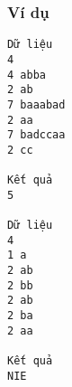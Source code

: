 \subsubsection{   Ví dụ  }
\begin{verbatim}
Dữ liệu
4
4 abba
2 ab
7 baaabad
2 aa
7 badccaa
2 cc

Kết quả
5

Dữ liệu
4
1 a
2 ab
2 bb
2 ab
2 ba
2 aa

Kết quả
NIE
\end{verbatim}